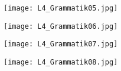     \begin{figure}[ht!]
      \centering
      \texttt{[image: L4\_Grammatik05.jpg]}
      \caption*{ }
      \label{NJ:fig_L4_Grammatik05}
    \end{figure}
    
    \begin{figure}[ht!]
      \centering
      \texttt{[image: L4\_Grammatik06.jpg]}
      \caption*{ }
      \label{NJ:fig_L4_Grammatik06}
    \end{figure}
    
    \begin{figure}[ht!]
      \centering
      \texttt{[image: L4\_Grammatik07.jpg]}
      \caption*{ }
      \label{NJ:fig_L4_Grammatik07}
    \end{figure}
    
    \begin{figure}[ht!]
      \centering
      \texttt{[image: L4\_Grammatik08.jpg]}
      \caption*{ }
      \label{NJ:fig_L4_Grammatik08}
    \end{figure}